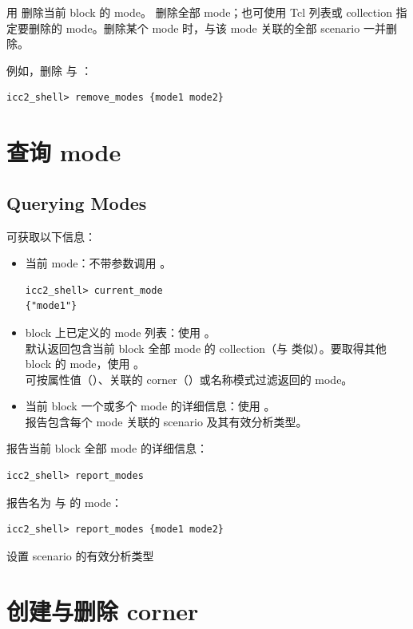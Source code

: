 用  删除当前 block 的 mode。 删除全部 mode；也可使用 Tcl 列表或 collection 指定要删除的 mode。删除某个 mode 时，与该 mode 关联的全部 scenario 一并删除。

例如，删除  与 ：
\begin{lstlisting}
icc2_shell> remove_modes {mode1 mode2}
\end{lstlisting}

\section{查询 mode}
\subsection*{Querying Modes}

可获取以下信息：
\begin{itemize}
  \item 当前 mode：不带参数调用 。
\begin{lstlisting}
icc2_shell> current_mode
{"mode1"}
\end{lstlisting}
  \item block 上已定义的 mode 列表：使用 。\\
        默认返回包含当前 block 全部 mode 的 collection（与  类似）。要取得其他 block 的 mode，使用 。\\
        可按属性值（）、关联的 corner（）或名称模式过滤返回的 mode。
  \item 当前 block 一个或多个 mode 的详细信息：使用 。\\
        报告包含每个 mode 关联的 scenario 及其有效分析类型。
\end{itemize}

报告当前 block 全部 mode 的详细信息：
\begin{lstlisting}
icc2_shell> report_modes
\end{lstlisting}

报告名为  与  的 mode：
\begin{lstlisting}
icc2_shell> report_modes {mode1 mode2}
\end{lstlisting}

\begin{seeAlsoBox}
设置 scenario 的有效分析类型
\end{seeAlsoBox}

\section{创建与删除 corner}
